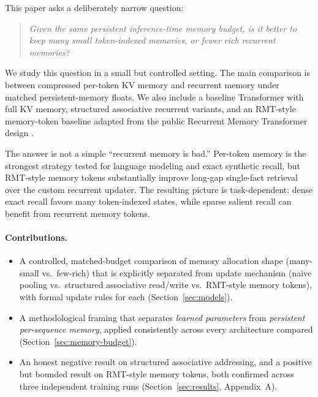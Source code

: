 \documentclass[10pt]{article} %
\begin{document}
This paper asks a deliberately narrow question:

\begin{quote}
\itshape
Given the same persistent inference-time memory budget, is it better to keep
many small token-indexed memories, or fewer rich recurrent memories?
\end{quote}

We study this question in a small but controlled setting. The main
comparison is between compressed per-token KV memory and recurrent memory
under matched persistent-memory floats. We also include a baseline
Transformer with full KV memory, structured associative recurrent variants,
and an RMT-style memory-token baseline adapted from the public Recurrent
Memory Transformer design \citep{bulatov2022rmt}.

The answer is not a simple ``recurrent memory is bad.'' Per-token memory is
the strongest strategy tested for language modeling and exact synthetic
recall, but RMT-style memory tokens substantially improve long-gap
single-fact retrieval over the custom recurrent updater. The resulting
picture is task-dependent: dense exact recall favors many token-indexed
states, while sparse salient recall can benefit from recurrent memory
tokens.

\paragraph{Contributions.}
\begin{itemize}[leftmargin=*]
  \item A controlled, matched-budget comparison of memory allocation shape
  (many-small vs.\ few-rich) that is explicitly separated from update
  mechanism (naive pooling vs.\ structured associative read/write vs.\
  RMT-style memory tokens), with formal update rules for each (Section~\ref{sec:models}).
  \item A methodological framing that separates \emph{learned parameters}
  from \emph{persistent per-sequence memory}, applied consistently across
  every architecture compared (Section~\ref{sec:memory-budget}).
  \item An honest negative result on structured associative addressing,
  and a positive but bounded result on RMT-style memory tokens, both
  confirmed across three independent training runs
  (Section~\ref{sec:results}, Appendix~A).
\end{itemize}

\end{document}
